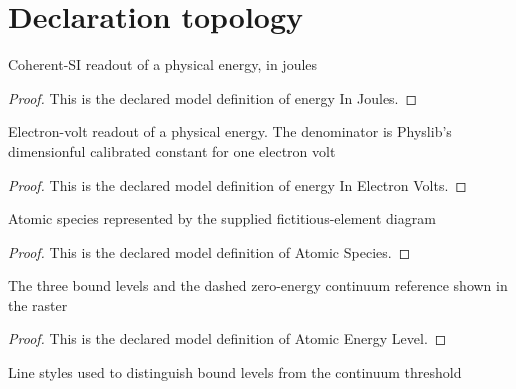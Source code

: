 \section{Declaration topology}
\begin{definition}
  \label{def:physics:phyx-mini-0644:phyxminiproblems-problemphyxmini0644-energyinjoules}
  Coherent-SI readout of a physical energy, in joules
\end{definition}
\begin{proof}
  This is the declared model definition of energy In Joules.
\end{proof}
\begin{definition}
  \label{def:physics:phyx-mini-0644:phyxminiproblems-problemphyxmini0644-energyinelectronvolts}
  Electron-volt readout of a physical energy. The denominator is Physlib's dimensionful calibrated constant for one electron volt
\end{definition}
\begin{proof}
  This is the declared model definition of energy In Electron Volts.
\end{proof}
\begin{definition}
  \label{def:physics:phyx-mini-0644:phyxminiproblems-problemphyxmini0644-atomicspecies}
  Atomic species represented by the supplied fictitious-element diagram
\end{definition}
\begin{proof}
  This is the declared model definition of Atomic Species.
\end{proof}
\begin{definition}
  \label{def:physics:phyx-mini-0644:phyxminiproblems-problemphyxmini0644-atomicenergylevel}
  The three bound levels and the dashed zero-energy continuum reference shown in the raster
\end{definition}
\begin{proof}
  This is the declared model definition of Atomic Energy Level.
\end{proof}
\begin{definition}
  \label{def:physics:phyx-mini-0644:phyxminiproblems-problemphyxmini0644-energylevellinestyle}
  Line styles used to distinguish bound levels from the continuum threshold
\end{definition}
